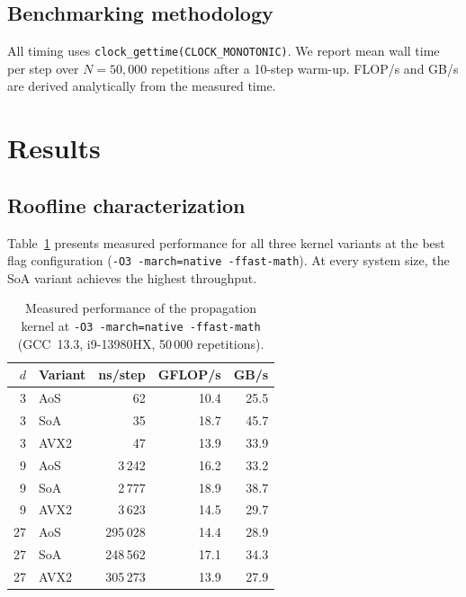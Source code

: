 \documentclass[a4paper,noarxiv]{quantumarticle}
\begin{document}
\subsection{Benchmarking methodology}
\label{sec:bench}

All timing uses \texttt{clock\_gettime(CLOCK\_MONO\-TONIC)}.
We report mean wall time per step over $N = 50{,}000$ repetitions after a
10-step warm-up. FLOP/s and GB/s are derived analytically from the measured
time.

\section{Results}
\label{sec:results}

\subsection{Roofline characterization}
\label{sec:roofline_results}

Table~\ref{tab:perf} presents measured performance for all three kernel
variants at the best flag configuration (\texttt{-O3 -march=native
-ffast-math}). At every system size, the SoA variant achieves the highest
throughput.

\begin{table}[h]
  \centering
  \caption{Measured performance of the propagation kernel at
           \texttt{-O3 -march=native -ffast-math}
           (GCC~13.3, i9-13980HX, 50\,000 repetitions).}
  \label{tab:perf}
  \begin{tabular}{@{}rlrrr@{}}
    \toprule
    $d$ & Variant & ns/step & GFLOP/s & GB/s \\
    \midrule
    3  & AoS     & 62    & 10.4 & 25.5 \\
    3  & SoA     & 35    & 18.7 & 45.7 \\
    3  & AVX2    & 47    & 13.9 & 33.9 \\
    \midrule
    9  & AoS     & 3\,242  & 16.2 & 33.2 \\
    9  & SoA     & 2\,777  & 18.9 & 38.7 \\
    9  & AVX2    & 3\,623  & 14.5 & 29.7 \\
    \midrule
    27 & AoS     & 295\,028 & 14.4 & 28.9 \\
    27 & SoA     & 248\,562 & 17.1 & 34.3 \\
    27 & AVX2    & 305\,273 & 13.9 & 27.9 \\
    \bottomrule
  \end{tabular}
\end{table}
\end{document}
